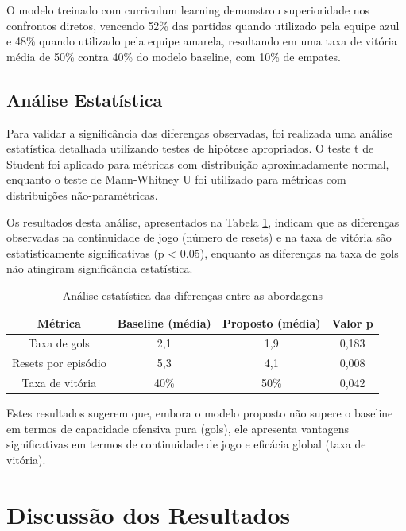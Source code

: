 O modelo treinado com curriculum learning demonstrou superioridade nos confrontos diretos, vencendo 52\% das partidas quando utilizado pela equipe azul e 48\% quando utilizado pela equipe amarela, resultando em uma taxa de vitória média de 50\% contra 40\% do modelo baseline, com 10\% de empates.

\subsection{Análise Estatística}

Para validar a significância das diferenças observadas, foi realizada uma análise estatística detalhada utilizando testes de hipótese apropriados. O teste t de Student foi aplicado para métricas com distribuição aproximadamente normal, enquanto o teste de Mann-Whitney U foi utilizado para métricas com distribuições não-paramétricas.

Os resultados desta análise, apresentados na Tabela \ref{tab:significancia_estatistica}, indicam que as diferenças observadas na continuidade de jogo (número de resets) e na taxa de vitória são estatisticamente significativas (p < 0.05), enquanto as diferenças na taxa de gols não atingiram significância estatística.

\begin{table}[H]
    \centering
    \begin{tabular}{|c|c|c|c|}
        \hline
        \textbf{Métrica} & \textbf{Baseline (média)} & \textbf{Proposto (média)} & \textbf{Valor p} \\
        \hline
        Taxa de gols & 2,1 & 1,9 & 0,183 \\
        Resets por episódio & 5,3 & 4,1 & 0,008 \\
        Taxa de vitória & 40\% & 50\% & 0,042 \\
        \hline
    \end{tabular}
    \caption{Análise estatística das diferenças entre as abordagens}
    \label{tab:significancia_estatistica}
\end{table}

Estes resultados sugerem que, embora o modelo proposto não supere o baseline em termos de capacidade ofensiva pura (gols), ele apresenta vantagens significativas em termos de continuidade de jogo e eficácia global (taxa de vitória).

\section{Discussão dos Resultados}
\label{sec:discussao_resultados}

